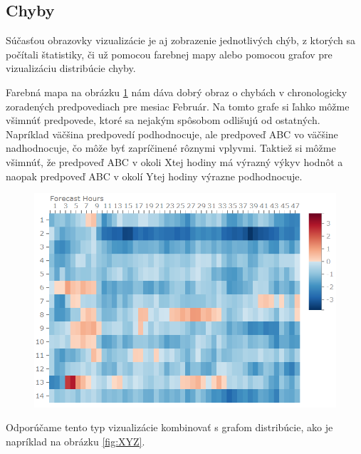 \subsection{Chyby}

Súčasťou obrazovky vizualizácie je aj zobrazenie jednotlivých chýb, z ktorých sa počítali štatistiky, či už pomocou farebnej mapy alebo pomocou grafov pre vizualizáciu distribúcie chyby.

Farebná mapa na obrázku \ref{fig:errors} nám dáva dobrý obraz o chybách v chronologicky zoradených predpovediach pre mesiac Február. Na tomto grafe si ľahko môžme všimnúť predpovede, ktoré sa nejakým spôsobom odlišujú od ostatných. Napríklad väčšina predpovedí podhodnocuje, ale predpoveď ABC vo väčšine nadhodnocuje, čo môže byť zapríčinené rôznymi vplyvmi. Taktiež si môžme všimnúť, že predpoveď ABC v okoli Xtej hodiny má výrazný výkyv hodnôt a naopak predpoveď ABC v okolí Ytej hodiny výrazne podhodnocuje.


\begin{figure}
	\centering
	\includegraphics[width = 6.5in]{errors}
	\caption{}
	\label{fig:errors} 
\end{figure}

Odporúčame tento typ vizualizácie kombinovať s grafom distribúcie, ako je napríklad na obrázku \ref{fig:XYZ}.


  

